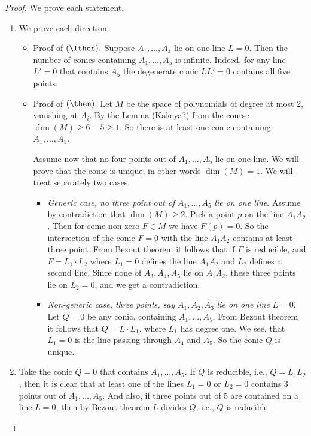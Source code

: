 \documentclass[12pt, a4paper]{article}
\begin{document}
\begin{proof}
    We prove each statement.
    \begin{enumerate}
        \item We prove each direction.
        \begin{itemize}
            \item Proof of \((\lthen).\) Suppose \( A_1, \ldots, A_4 \) lie on one line \( L = 0 \). Then the number of conics containing \( A_1, \ldots, A_5 \) is infinite. Indeed, for any line \( L' = 0 \) that contains \( A_5 \) the degenerate conic \( LL' = 0 \) contains all five points.
            \item Proof of \((\then).\) Let \( M \) be the space of polynomials of degree at most 2, vanishing at \( A_i \). By the Lemma (Kakeya?) from the course \(\dim(M) \geq 6 - 5 \geq 1 \). So there is at least one conic containing \( A_1, \ldots, A_5 \).

            Assume now that no four points out of \( A_1, \ldots, A_5 \) lie on one line. We will prove that the conic is unique, in other words \(\dim(M) = 1\). We will treat separately two cases.
            \begin{itemize}
                \item \textit{Generic case, no three point out of} \( A_1, \ldots, A_5 \) \textit{lie on one line}. Assume by contradiction that \(\dim(M) \geq 2\). Pick a point \( p \) on the line \( A_1A_2 \). Then for some non-zero \( F \in M \) we have \( F(p) = 0 \). So the intersection of the conic \( F = 0 \) with the line \( A_1A_2 \) contains at least three point. From Bezout theorem it follows that if \( F \) is reducible, and \( F = L_1 \cdot L_2 \) where \( L_1 = 0 \) defines the line \( A_1A_2 \) and \( L_2 \) defines a second line. Since none of \( A_3, A_4, A_5 \) lie on \( A_1A_2 \), these three points lie on \( L_2 = 0 \), and we get a contradiction.
                \item \textit{Non-generic case, three points, say} \( A_1, A_2, A_3 \) \textit{lie on one line} \( L = 0 \). Let \( Q = 0 \) be any conic, containing \( A_1, \ldots, A_5 \). From Bezout theorem it follows that \( Q = L \cdot L_1 \), where \( L_1 \) has degree one. We see, that \( L_1 = 0 \) is the line passing through \( A_4 \) and \( A_5 \). So the conic \( Q \) is unique.
            \end{itemize}
        \end{itemize}
        \item Take the conic \( Q = 0 \) that contains \( A_1, \ldots, A_5 \). If \( Q \) is reducible, i.e., \( Q = L_1L_2 \), then it is clear that at least one of the lines \( L_1 = 0 \) or \( L_2 = 0 \) contains 3 points out of \( A_1, \ldots, A_5 \). And also, if three points out of 5 are contained on a line \( L = 0 \), then by Bezout theorem \( L \) divides \( Q \), i.e., \( Q \) is reducible.
    \end{enumerate}
\end{proof}
\end{document}
